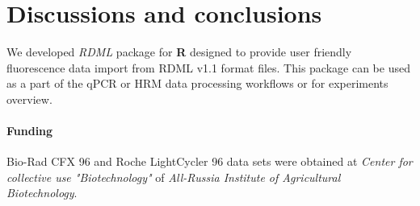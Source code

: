\documentclass{bioinfo}
\begin{document}
\section{Discussions and conclusions}

We developed \textit{RDML} package for \textbf{R} designed to provide user friendly fluorescence data import from RDML v1.1 format files. This package can be used as a part of the qPCR or HRM data processing workflows or for experiments overview.

\paragraph{Funding\textcolon}  Bio-Rad CFX 96 and Roche LightCycler 96 data sets were obtained at \textit{Center for collective use "Biotechnology"} of \textit{All-Russia Institute of Agricultural Biotechnology}.

%
%
%
%
%
%

%

\end{document}
